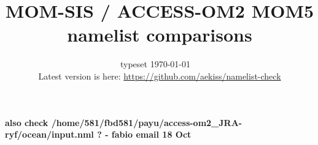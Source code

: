 \documentclass[10pt]{article}
\title{MOM-SIS / ACCESS-OM2 MOM5 namelist comparisons}
\author{}
\date{\vspace{-4ex}
    {\footnotesize 
        typeset \today\ \DTMcurrenttime\ \DTMcurrentzone \\ 
        Latest version is here: \url{https://github.com/aekiss/namelist-check}
    }    
}
\newcommand{\doscript}[1]{{\footnotesize\textsf{}}}
\begin{document}
\maketitle



%

%
%





\textbf{also check /home/581/fbd581/payu/access-om2_JRA-ryf/ocean/input.nml ? - fabio email 18 Oct}
\end{document}
